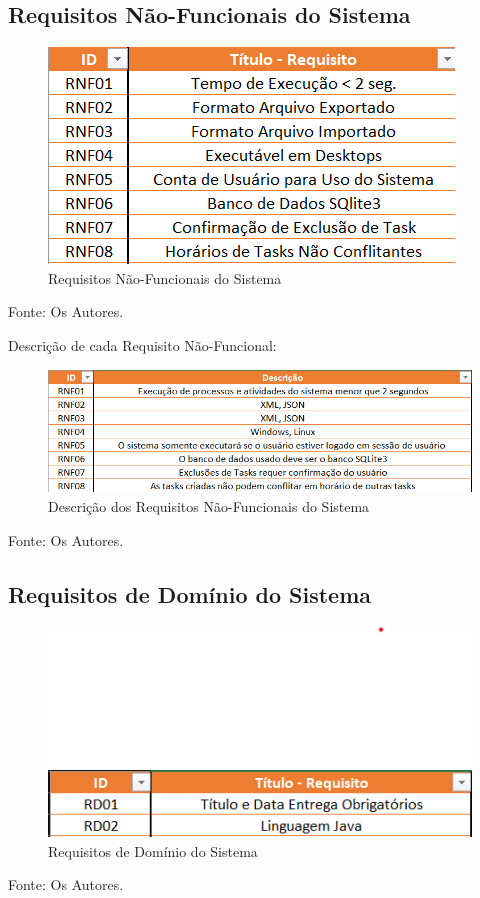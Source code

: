 \documentclass[a4paper,12pt]{article}
\begin{document}
\subsection{Requisitos Não-Funcionais do Sistema}
\begin{figure}[H]
	\centering
	\includegraphics[scale=0.80]{requirements/not-functionals/not-functionals.png}
	\caption{Requisitos Não-Funcionais do Sistema}
\end{figure}
\noindent Fonte: Os Autores.


Descrição de cada Requisito Não-Funcional:
\begin{figure}[H]
	\centering
	\includegraphics[scale=0.80]{requirements/not-functionals/description.png}
	\caption{Descrição dos Requisitos Não-Funcionais do Sistema}
\end{figure}
\noindent Fonte: Os Autores.


\subsection{Requisitos de Domínio do Sistema}
\begin{figure}[H]
	\centering
	\includegraphics[scale=0.80]{requirements/domain/domain.png}
	\caption{Requisitos de Domínio do Sistema}
\end{figure}
\noindent Fonte: Os Autores.
\end{document}
